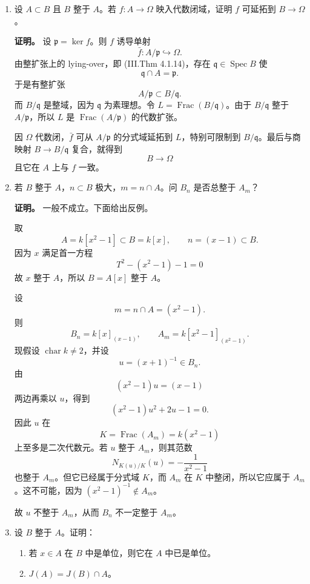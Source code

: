 \documentclass[a4paper]{ctexart}
\begin{document}
\begin{enumerate}[leftmargin=*, label=\textbf{5.\arabic*.}]
\item 设 \(A\subset B\) 且 \(B\) 整于 \(A\)。若 \(f:A\to \Omega\) 映入代数闭域，证明 \(f\) 可延拓到 \(B\to \Omega\)。

\textbf{证明。}
设 \(\mathfrak p=\ker f\)。则 \(f\) 诱导单射
\[
\bar f:A/\mathfrak p \hookrightarrow \Omega.
\]
由整扩张上的 lying-over，即 (III.Thm 4.1.14)，存在 \(\mathfrak q\in \operatorname{Spec}B\) 使
\[
\mathfrak q\cap A=\mathfrak p.
\]
于是有整扩张
\[
A/\mathfrak p \subset B/\mathfrak q.
\]
而 \(B/\mathfrak q\) 是整域，因为 \(\mathfrak q\) 为素理想。令 \(L=\operatorname{Frac}(B/\mathfrak q)\)。由于 \(B/\mathfrak q\) 整于 \(A/\mathfrak p\)，所以 \(L\) 是 \(\operatorname{Frac}(A/\mathfrak p)\) 的代数扩张。

因 \(\Omega\) 代数闭，\(\bar f\) 可从 \(A/\mathfrak p\) 的分式域延拓到 \(L\)，特别可限制到 \(B/\mathfrak q\)。最后与商映射 \(B\to B/\mathfrak q\) 复合，就得到
\[
B\to \Omega
\]
且它在 \(A\) 上与 \(f\) 一致。

\setcounter{enumi}{3}
\item 若 \(B\) 整于 \(A\)，\(n\subset B\) 极大，\(m=n\cap A\)。问 \(B_n\) 是否总整于 \(A_m\)？

\textbf{证明。}
一般不成立。下面给出反例。

取
\[
A=k[x^2-1]\subset B=k[x],\qquad n=(x-1)\subset B.
\]
因为 \(x\) 满足首一方程
\[
T^2-(x^2-1)-1=0
\]
故 \(x\) 整于 \(A\)，所以 \(B=A[x]\) 整于 \(A\)。

设
\[
m=n\cap A=(x^2-1).
\]
则
\[
B_n=k[x]_{(x-1)},\qquad A_m=k[x^2-1]_{(x^2-1)}.
\]
现假设 \(\operatorname{char}k\neq 2\)，并设
\[
u=(x+1)^{-1}\in B_n.
\]
由
\[
(x^2-1)u=(x-1)
\]
两边再乘以 \(u\)，得到
\[
(x^2-1)u^2+2u-1=0.
\]
因此 \(u\) 在
\[
K=\operatorname{Frac}(A_m)=k(x^2-1)
\]
上至多是二次代数元。若 \(u\) 整于 \(A_m\)，则其范数
\[
N_{K(u)/K}(u)=-\frac{1}{x^2-1}
\]
也整于 \(A_m\)。但它已经属于分式域 \(K\)，而 \(A_m\) 在 \(K\) 中整闭，所以它应属于 \(A_m\)。这不可能，因为 \((x^2-1)^{-1}\notin A_m\)。

故 \(u\) 不整于 \(A_m\)，从而 \(B_n\) 不一定整于 \(A_m\)。

\setcounter{enumi}{4}
\item 设 \(B\) 整于 \(A\)。证明：
\begin{enumerate}[label=(\roman*)]
\item 若 \(x\in A\) 在 \(B\) 中是单位，则它在 \(A\) 中已是单位。
\item \(J(A)=J(B)\cap A\)。
\end{enumerate}


\end{enumerate}
\end{document}
